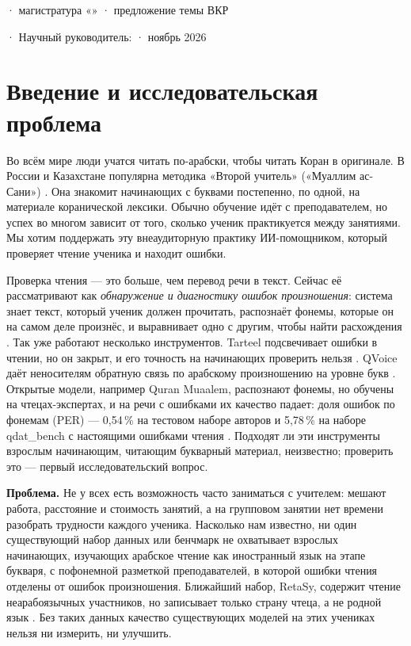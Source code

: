 \documentclass[a4paper,14pt]{extarticle}
\begin{document}
\thispagestyle{plain}
\begin{center}
{\small \thesisUniversityRu{} · магистратура «\thesisSpecialtyRu» · предложение темы ВКР}\\[8pt]
{\large\bfseries \thesisTopicRu\par}
\vspace{6pt}
{\thesisAuthorRu} · Научный руководитель: \thesisSupervisorRu{} · ноябрь 2026
\end{center}

\section{Введение и исследовательская проблема}

Во всём мире люди учатся читать по-арабски, чтобы читать Коран в оригинале. В России и Казахстане
популярна методика «Второй учитель» («Муаллим ас-Сани») \cite{SRC-040}. Она знакомит начинающих с буквами
постепенно, по одной, на материале коранической лексики. Обычно обучение идёт с преподавателем, но успех
во многом зависит от того, сколько ученик практикуется между занятиями. Мы хотим поддержать эту
внеаудиторную практику ИИ-помощником, который проверяет чтение ученика и находит ошибки.

Проверка чтения --- это больше, чем перевод речи в текст. Сейчас её рассматривают как \emph{обнаружение и
диагностику ошибок произношения}: система знает текст, который ученик должен прочитать, распознаёт фонемы,
которые он на самом деле произнёс, и выравнивает одно с другим, чтобы найти расхождения \cite{SRC-031}.
Так уже работают несколько инструментов. Tarteel подсвечивает ошибки в чтении, но он закрыт, и его
точность на начинающих проверить нельзя \cite{SRC-046}. QVoice даёт неносителям обратную связь по
арабскому произношению на уровне букв \cite{SRC-150}. Открытые модели, например Quran Muaalem, распознают
фонемы, но обучены на чтецах-экспертах, и на речи с ошибками их качество падает: доля ошибок по фонемам
(PER) --- 0,54\,\% на тестовом наборе авторов и 5,78\,\% на наборе qdat\_bench с настоящими ошибками
чтения \cite{SRC-002}. Подходят ли эти инструменты взрослым начинающим, читающим букварный материал,
неизвестно; проверить это --- первый исследовательский вопрос.

\textbf{Проблема.} Не у всех есть возможность часто заниматься с учителем: мешают работа, расстояние и
стоимость занятий, а на групповом занятии нет времени разобрать трудности каждого ученика. Насколько нам
известно, ни один существующий набор данных или бенчмарк не охватывает взрослых начинающих, изучающих
арабское чтение как иностранный язык на этапе букваря, с пофонемной разметкой преподавателей, в которой
ошибки чтения отделены от ошибок произношения. Ближайший набор, RetaSy, содержит чтение неарабоязычных
участников, но записывает только страну чтеца, а не родной язык \cite{SRC-032}. Без таких данных качество
существующих моделей на этих учениках нельзя ни измерить, ни улучшить.
\end{document}
